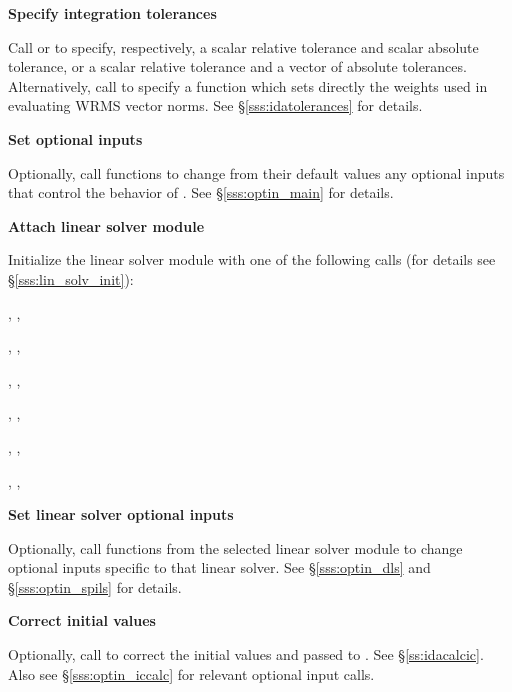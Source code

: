 \begin{Steps}
\item
  {\bf Specify integration tolerances}

  Call  or 
  to specify, respectively, a scalar relative tolerance and scalar
  absolute tolerance, or a scalar relative tolerance and a vector of
  absolute tolerances.  Alternatively, call  to
  specify a function which sets directly the weights used in
  evaluating WRMS vector norms.  See \S\ref{sss:idatolerances} for
  details.

\item
  {\bf Set optional inputs}

  Optionally, call  functions to change from their default values any
  optional inputs that control the behavior of {\ida}.
  See \S\ref{sss:optin_main} for details.

\item\label{i:lin_solver} 
  {\bf Attach linear solver module}

  Initialize the linear solver module
  with one of the following calls (for details see \S\ref{sss:lin_solv_init}):

  {\s, \omp, \pt} 

  {\s, \omp, \pt} 

  {\s, \omp, \pt} 

  {\s, \omp, \pt} 

  {\s, \omp, \pt} 

  {\s, \omp, \pt} 




\item
  {\bf Set linear solver optional inputs}

  Optionally, call  functions from the selected linear solver module to
  change optional inputs specific to that linear solver.
  See \S\ref{sss:optin_dls} and \S\ref{sss:optin_spils} for details.

\item 
  {\bf Correct initial values}

  Optionally, call  to correct the initial values
   and  passed to .  See \S\ref{ss:idacalcic}.
  Also see \S\ref{sss:optin_iccalc} for relevant optional input calls.


\end{Steps}
